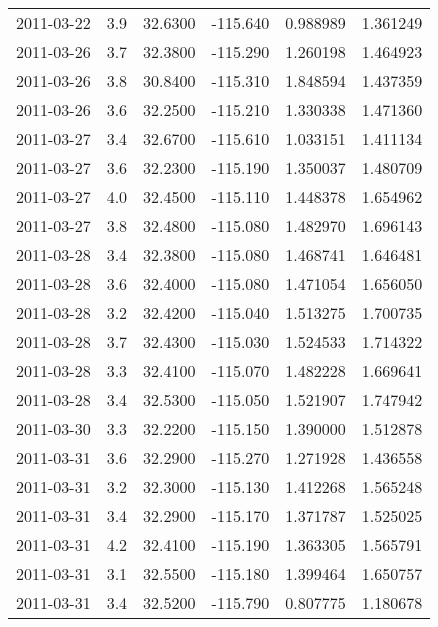 \begin{tabular}{lrrrrr}
2011-03-22 &       3.9 &  32.6300 &  -115.640 &         0.988989 &         1.361249 \\
2011-03-26 &       3.7 &  32.3800 &  -115.290 &         1.260198 &         1.464923 \\
2011-03-26 &       3.8 &  30.8400 &  -115.310 &         1.848594 &         1.437359 \\
2011-03-26 &       3.6 &  32.2500 &  -115.210 &         1.330338 &         1.471360 \\
2011-03-27 &       3.4 &  32.6700 &  -115.610 &         1.033151 &         1.411134 \\
2011-03-27 &       3.6 &  32.2300 &  -115.190 &         1.350037 &         1.480709 \\
2011-03-27 &       4.0 &  32.4500 &  -115.110 &         1.448378 &         1.654962 \\
2011-03-27 &       3.8 &  32.4800 &  -115.080 &         1.482970 &         1.696143 \\
2011-03-28 &       3.4 &  32.3800 &  -115.080 &         1.468741 &         1.646481 \\
2011-03-28 &       3.6 &  32.4000 &  -115.080 &         1.471054 &         1.656050 \\
2011-03-28 &       3.2 &  32.4200 &  -115.040 &         1.513275 &         1.700735 \\
2011-03-28 &       3.7 &  32.4300 &  -115.030 &         1.524533 &         1.714322 \\
2011-03-28 &       3.3 &  32.4100 &  -115.070 &         1.482228 &         1.669641 \\
2011-03-28 &       3.4 &  32.5300 &  -115.050 &         1.521907 &         1.747942 \\
2011-03-30 &       3.3 &  32.2200 &  -115.150 &         1.390000 &         1.512878 \\
2011-03-31 &       3.6 &  32.2900 &  -115.270 &         1.271928 &         1.436558 \\
2011-03-31 &       3.2 &  32.3000 &  -115.130 &         1.412268 &         1.565248 \\
2011-03-31 &       3.4 &  32.2900 &  -115.170 &         1.371787 &         1.525025 \\
2011-03-31 &       4.2 &  32.4100 &  -115.190 &         1.363305 &         1.565791 \\
2011-03-31 &       3.1 &  32.5500 &  -115.180 &         1.399464 &         1.650757 \\
2011-03-31 &       3.4 &  32.5200 &  -115.790 &         0.807775 &         1.180678 \\

\end{tabular}
